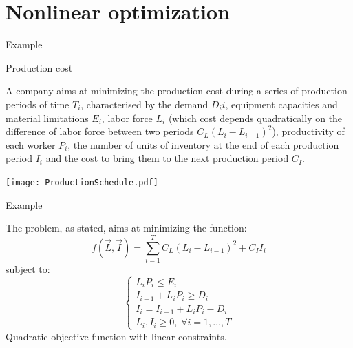 \documentclass[c]{beamer}
\begin{document}
\section{Nonlinear optimization}
\begin{frame}[t]{Example}{}

  \begin{block}{Production cost}

    A company aims at minimizing the production cost during a series of production periods of time $T_i$, characterised by the demand $D_ii$, equipment capacities and material limitations $E_i$, labor force $L_i$ (which cost depends quadratically on the difference of labor force between two periods $C_L(L_i-L_{i-1})^2$), productivity of each worker $P_i$, the number of units of inventory at the end of each production period $I_i$ and the cost to bring them to the next production period $C_I$.

  \begin{center}
    \texttt{[image: ProductionSchedule.pdf]}
  \end{center}
\end{block}

\end{frame}
\begin{frame}{Example}

  The problem, as stated, aims at minimizing the function:
  \[f(\vec{L},\vec{I})=\sum_{i=1}^T C_L (L_i-L_{i-1})^2+C_I I_i\]
  subject to:
  \[
  \begin{cases}
    L_iP_i \leq E_i\\
    I_{i-1}+L_i P_i \geq D_i\\
    I_i = I_{i-1} + L_i P_i -D_i\\
    L_i,I_i \geq 0, \; \forall i=1,\ldots,T
  \end{cases}
  \]
  Quadratic objective function with linear constraints.

\end{frame}
\end{document}
